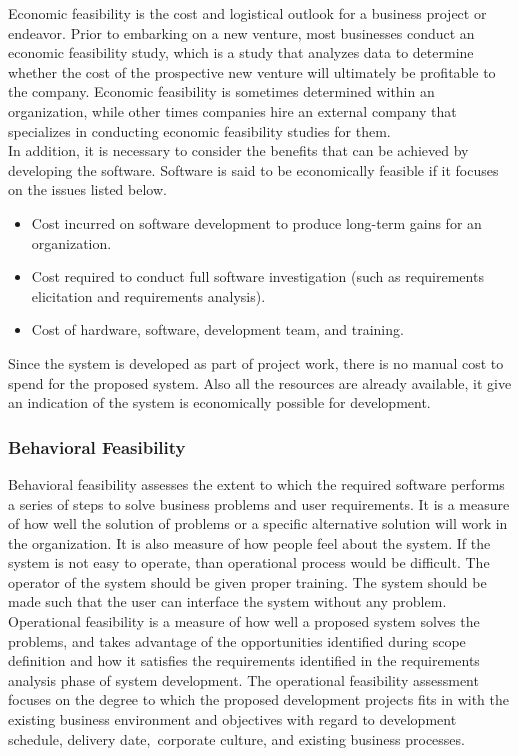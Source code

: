 Economic feasibility is the cost and logistical outlook for a business project or endeavor. Prior to embarking on a new venture, most businesses conduct an economic feasibility study, which is a study that analyzes data to determine whether the cost of the prospective new venture will ultimately be profitable to the company. Economic feasibility is sometimes determined within an organization, while other times companies hire an external company that specializes in conducting economic feasibility studies for them.\\

In addition, it is necessary to consider the benefits that can be achieved by developing the software. Software is said to be economically feasible if it focuses on the issues listed below.
\begin{itemize}
	\item Cost incurred on software development to produce long-term gains for an organization.
	\item Cost required to conduct full software investigation (such as requirements elicitation and requirements analysis).
	\item Cost of hardware, software, development team, and training.
\end{itemize}


Since the system is developed as part of project work, there is no manual cost to spend for the proposed system. Also all the resources are already available, it give an indication of the system is economically possible for development.

\subsubsection{Behavioral Feasibility}
Behavioral feasibility assesses the extent to which the required software performs a series of steps to solve business problems and user requirements. It is a measure of how well the solution of problems or a specific alternative solution will work in the organization. It is also measure of how people feel about the system. If the system is not easy to operate, than operational process would be difficult. The operator of the system should be given proper training. The system should be made such that the user can interface the system without any problem.\\

Operational feasibility is a measure of how well a proposed system solves the problems, and takes advantage of the opportunities identified during scope definition and how it satisfies the requirements identified in the requirements analysis phase of system development. The operational feasibility assessment focuses on the degree to which the proposed development projects fits in with the existing business environment and objectives with regard to development schedule, delivery date, corporate culture, and existing business processes.\\

